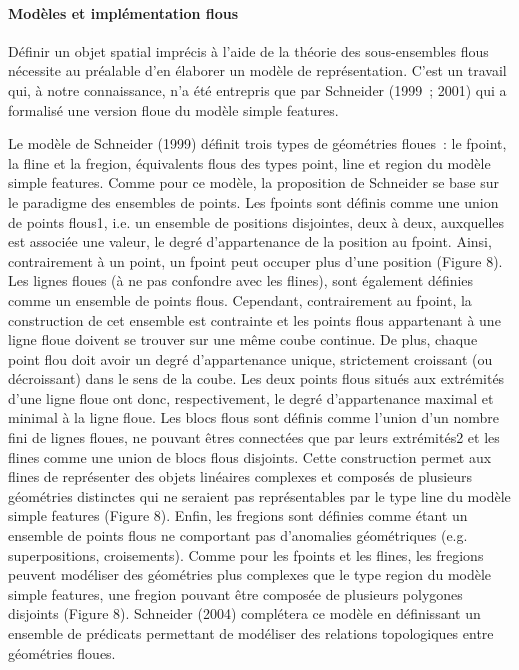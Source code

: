 \paragraph{Modèles et implémentation flous}

Définir un objet spatial imprécis à l’aide de la théorie des
sous-ensembles flous nécessite au préalable d’en élaborer un modèle de
représentation. C’est un travail qui, à notre connaissance, n’a été
entrepris que par Schneider (1999 ; 2001) qui a formalisé une version
floue du modèle simple features.

Le modèle de Schneider (1999) définit trois types de géométries
floues : le fpoint, la fline et la fregion, équivalents flous des
types point, line et region du modèle simple features. Comme pour ce
modèle, la proposition de Schneider se base sur le paradigme des
ensembles de points. Les fpoints sont définis comme une union de
points flous1, i.e. un ensemble de positions disjointes, deux à deux,
auxquelles est associée une valeur, le degré d’appartenance de la
position au fpoint. Ainsi, contrairement à un point, un fpoint peut
occuper plus d’une position (Figure 8). Les lignes floues (à ne pas
confondre avec les flines), sont également définies comme un ensemble
de points flous. Cependant, contrairement au fpoint, la construction
de cet ensemble est contrainte et les points flous appartenant à une
ligne floue doivent se trouver sur une même coube continue. De plus,
chaque point flou doit avoir un degré d’appartenance unique,
strictement croissant (ou décroissant) dans le sens de la coube. Les
deux points flous situés aux extrémités d’une ligne floue ont donc,
respectivement, le degré d’appartenance maximal et minimal à la ligne
floue. Les blocs flous sont définis comme l’union d’un nombre fini de
lignes floues, ne pouvant êtres connectées que par leurs extrémités2
et les flines comme une union de blocs flous disjoints. Cette
construction permet aux flines de représenter des objets linéaires
complexes et composés de plusieurs géométries distinctes qui ne
seraient pas représentables par le type line du modèle simple features
(Figure 8). Enfin, les fregions sont définies comme étant un ensemble
de points flous ne comportant pas d’anomalies géométriques
(e.g. superpositions, croisements). Comme pour les fpoints et les
flines, les fregions peuvent modéliser des géométries plus complexes
que le type region du modèle simple features, une fregion pouvant être
composée de plusieurs polygones disjoints (Figure 8). Schneider (2004)
complétera ce modèle en définissant un ensemble de prédicats
permettant de modéliser des relations topologiques entre géométries
floues.

